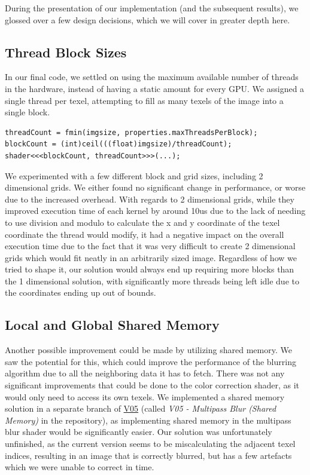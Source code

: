 \documentclass[10pt,journal,compsoc]{IEEEtran}
\begin{document}
\noindent During the presentation of our implementation (and the subsequent results), we glossed over a few design decisions, which we will cover in greater depth here. 


\subsection{Thread Block Sizes}

\noindent In our final code, we settled on using the maximum available number of threads in the hardware, instead of having a static amount for every GPU. We assigned a single thread per texel, attempting to fill as many texels of the image into a single block.  \\

\begin{lstlisting}[basicstyle=\small]
threadCount = fmin(imgsize, properties.maxThreadsPerBlock);
blockCount = (int)ceil(((float)imgsize)/threadCount);
shader<<<blockCount, threadCount>>>(...);
\end{lstlisting}

\noindent We experimented with a few different block and grid sizes, including 2 dimensional grids. We either found no significant change in performance, or worse due to the increased overhead. With regards to 2 dimensional grids, while they improved execution time of each kernel by around 10us due to the lack of needing to use division and modulo to calculate the x and y coordinate of the texel coordinate the thread would modify, it had a negative impact on the overall execution time due to the fact that it was very difficult to create 2 dimensional grids which would fit neatly in an arbitrarily sized image. Regardless of how we tried to shape it, our solution would always end up requiring more blocks than the 1 dimensional solution, with significantly more threads being left idle due to the coordinates ending up out of bounds. \\


\subsection{Local and Global Shared Memory}

\noindent Another possible improvement could be made by utilizing shared memory. We saw the potential for this, which could improve the performance of the blurring algorithm due to all the neighboring data it has to fetch. There was not any significant improvements that could be done to the color correction shader, as it would only need to access its own texels. We implemented a shared memory solution in a separate branch of \hyperref[sec:V05]{V05} (called \textit{V05 - Multipass Blur (Shared Memory)} in the repository), as implementing shared memory in the multipass blur shader would be significantly easier. Our solution was unfortunately unfinished, as the current version seems to be miscalculating the adjacent texel indices, resulting in an image that is correctly blurred, but has a few artefacts which we were unable to correct in time. \\
\end{document}
